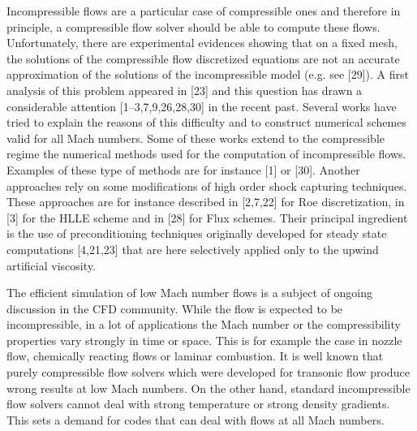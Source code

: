\documentclass[preprint,10pt]{elsarticle}
\begin{document}
Incompressible flows are a particular case of compressible ones and therefore in principle, a
compressible flow solver should be able to compute these flows. Unfortunately, there are experimental
evidences showing that on a fixed mesh, the solutions of the compressible flow discretized
equations are not an accurate approximation of the solutions of the incompressible model (e.g. see
[29]). A first analysis of this problem appeared in [23] and this question has drawn a considerable
attention [1–3,7,9,26,28,30] in the recent past. Several works have tried to explain the reasons of
this difficulty and to construct numerical schemes valid for all Mach numbers. Some of these
works extend to the compressible regime the numerical methods used for the computation of
incompressible flows. Examples of these type of methods are for instance [1] or [30]. Another
approaches rely on some modifications of high order shock capturing techniques. These approaches
are for instance described in [2,7,22] for Roe discretization, in [3] for the HLLE scheme
and in [28] for Flux schemes. Their principal ingredient is the use of preconditioning techniques
originally developed for steady state computations [4,21,23] that are here selectively applied only
to the upwind artificial viscosity.


The efficient simulation of low Mach number flows is a subject of ongoing discussion in the
CFD community. While the flow is expected to be incompressible, in a lot of applications
the Mach number or the compressibility properties vary strongly in time or space. This is
for example the case in nozzle  flow, chemically reacting flows or laminar combustion. It is
well known that purely compressible flow solvers which were developed for transonic 
flow produce wrong results at low Mach numbers. On the other hand, standard incompressible 
flow solvers cannot deal with strong temperature or strong density gradients. This sets a
demand for codes that can deal with flows at all Mach numbers.
\end{document}
